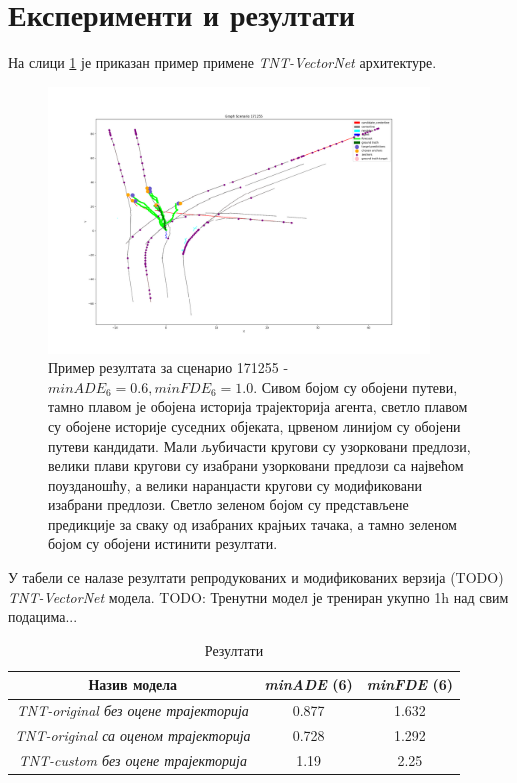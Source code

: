 \documentclass[11pt,oneside]{memoir}
\begin{document}
\section{Експерименти и резултати}

На слици \ref{tnt-scenario-171255} је приказан пример примене \textit{TNT-VectorNet} архитектуре. 

\begin{figure}[H]
  \centering
  \includegraphics[width=0.9\textwidth]{images/tnt-scenario-171255.png}
  \caption{
    Пример резултата за сценарио 171255 - $minADE_{6} = 0.6, minFDE_{6} = 1.0$. Сивом 
    бојом су обојени путеви, тамно плавом је обојена историја трајекторија агента, светло плавом су обојене историје суседних објеката,
    црвеном линијом су обојени путеви кандидати. Мали љубичасти кругови су узорковани предлози, велики плави кругови су изабрани
    узорковани предлози са највећом поузданошћу, а велики наранџасти кругови су модификовани изабрани предлози. Светло зеленом
    бојом су представљене предикције за сваку од изабраних крајњих тачака, а тамно зеленом бојом су обојени истинити резултати. 
    \label{tnt-scenario-171255}
  }
\end{figure}

У табели  се налазе резултати репродукованих и модификованих верзија (TODO) \textit{TNT-VectorNet} модела. TODO: Тренутни модел је трениран укупно 1h над свим подацима...

\begin{table}
  \begin{tabular}{c|c|c}
    Назив модела & \textit{minADE} (6) & \textit{minFDE} (6) \\
    \hline
    \textit{TNT-original без оцене трајекторија} & 0.877 & 1.632 \\
    \textit{TNT-original са оценом трајекторија} & 0.728 & 1.292 \\
    \textit{TNT-custom без оцене трајекторија}  & 1.19 & 2.25
  \end{tabular}
  \caption{Резултати}
  \label{vectornet-results}
\end{table}
\end{document}
